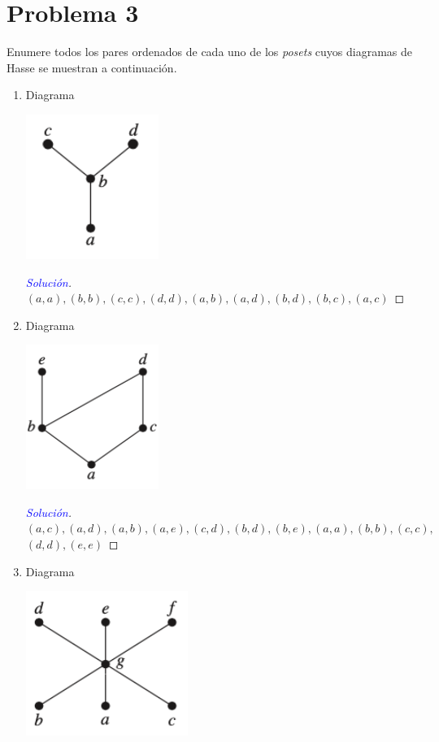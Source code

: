 \documentclass[a4paper,12pt]{article}
\newenvironment{solution}
  {\renewcommand\qedsymbol{$\square$}\begin{proof}[\textcolor{blue}{Solución}]}
  {\end{proof}}
\begin{document}
\section{Problema 3}
Enumere todos los pares ordenados de cada uno de los \textit{posets} cuyos diagramas de Hasse se muestran a continuación. 

\begin{enumerate}
    \item Diagrama 
    \begin{center}
        \includegraphics[scale=0.5]{Images/hasse1.png}
    \end{center}
    \begin{solution}
    $(a,a), (b,b), (c,c), (d,d), (a,b), (a,d), (b,d), (b,c), (a,c)$
    \end{solution}
    \item Diagrama
    \begin{center}
        \includegraphics[scale=0.5]{Images/hasse2.png}
    \end{center}
    \begin{solution}
    $(a,c), (a,d), (a,b), (a,e), (c,d), (b,d), (b,e), (a,a), (b,b), (c,c),$\\$ (d,d), (e,e)$
    \end{solution}
    \item Diagrama
    \begin{center}
        \includegraphics[scale=0.5]{Images/hasse3.png}

\end{center}
\end{enumerate}
\end{document}
